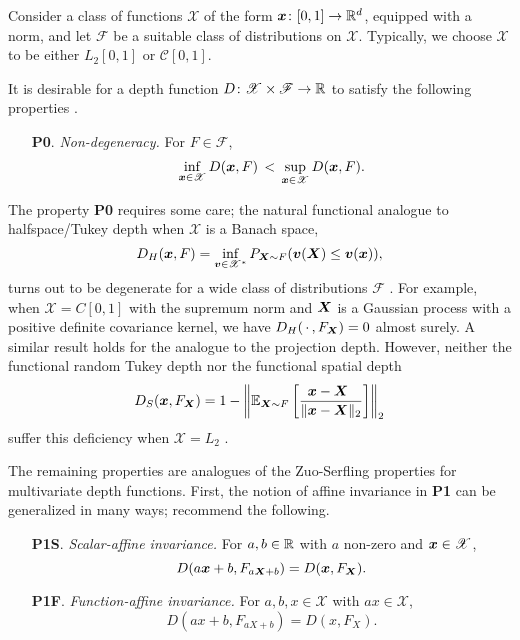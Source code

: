 Consider a class of functions $\mathscr{X}$ of the form $\bm{x}\colon [0, 1] \to
\mathbb{R}^d$, equipped with a norm, and let $\mathscr{F}$ be a suitable class of
distributions on $\mathscr{X}$.
Typically, we choose $\mathscr{X}$ to be either $L_2[0, 1]$ or $\mathcal{C}[0,
1]$.

It is desirable for a depth function $D\colon \mathscr{X} \times \mathscr{F}
\to \mathbb{R}$ to satisfy the following properties \parencite{gijbels-nagy-2017}.
\begin{enumerate}
    \item[\textbf{P0}.] \emph{Non-degeneracy.}
    For $F \in \mathscr{F}$,
    \begin{equation}
        \inf_{\bm{x} \in \mathscr{X}} D(\bm{x}, F) \,<\,
        \sup_{\bm{x} \in \mathscr{X}} D(\bm{x}, F).
    \end{equation}
\end{enumerate}

The property \textbf{P0} requires some care; the natural functional analogue
to halfspace/Tukey depth when $\mathscr{X}$ is a Banach space,
\begin{equation}
    D_H(\bm{x}, F) = \inf_{\bm{v} \in \mathscr{X}^*} P_{\bm{X} \sim F}(\bm{v}(\bm{X}) \leq \bm{v}(\bm{x})),
\end{equation}
turns out to be degenerate for a wide class of distributions $\mathscr{F}$
\parencite{chakraborty-chaudhuri-2014a}.
For example, when $\mathscr{X} = C[0, 1]$ with the supremum norm and $\bm{X}$ is
a Gaussian process with a positive definite covariance kernel, we have
$D_H(\,\cdot\,, F_{\bm{X}}) = 0$ almost surely.
A similar result holds for the analogue to the projection depth.
However, neither the functional random Tukey depth nor the functional spatial
depth
\begin{equation}
    D_S(\bm{x}, F_{\bm{X}}) = 1 - \left\Vert \operatorname{\mathbb{E}}_{\bm{X} \sim F} \left[\frac{\bm{x} - \bm{X}\;\,}{\Vert \bm{x} - \bm{X} \Vert_2}\right] \right\Vert_2
\end{equation}
suffer this deficiency when $\mathscr{X} = L_2$
\parencite{albertos-reyes-2008a, gijbels-nagy-2017}.


The remaining properties are analogues of the Zuo-Serfling properties for
multivariate depth functions.
First, the  notion of affine invariance in \textbf{P1} can be generalized in
many ways; \textcite{gijbels-nagy-2017} recommend the following.

\begin{enumerate}
    \item[\textbf{P1S}.] \emph{Scalar-affine invariance.}
    For $a, b \in \mathbb{R}$ with $a$ non-zero and $\bm{x} \in \mathscr{X}$,
    \begin{equation}
        D(a\bm{x} + b, F_{a\bm{X} + b}) = D(\bm{x}, F_{\bm{X}}).
    \end{equation}

    \item[\textbf{P1F}.] \emph{Function-affine invariance.}
    For $a, b, x \in \mathscr{X}$ with $ax \in \mathscr{X}$,
    \begin{equation}
        D(ax + b, F_{aX + b}) = D(x, F_{X}).
    \end{equation}
\end{enumerate}


